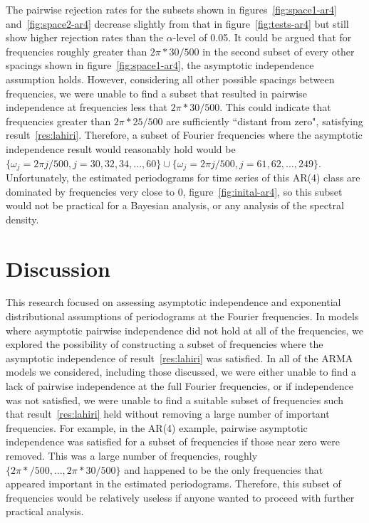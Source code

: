 \documentclass{article}\usepackage{graphicx, color}
\theoremstyle{plain}
\begin{document}
The pairwise rejection rates for the subsets shown in figures~\ref{fig:space1-ar4} and~\ref{fig:space2-ar4} decrease slightly from that in figure~\ref{fig:tests-ar4} but still show higher rejection rates than the $\alpha$-level of 0.05. It could be argued that for frequencies roughly greater than $2\pi * 30/500$ in the second subset of every other spacings shown in figure~\ref{fig:space1-ar4}, the asymptotic independence assumption holds. However, considering all other possible spacings between frequencies, we were unable to find a subset that resulted in pairwise independence at frequencies less that $2\pi * 30/500$. This could indicate that frequencies greater than $2 \pi * 25/500$ are sufficiently ``distant from zero", satisfying result~\ref{res:lahiri}. Therefore, a subset of Fourier frequencies where the asymptotic independence result would reasonably hold would be $\{\omega_j=2\pi j/500, j=30,32,34,...,60\} \cup \{\omega_j=2\pi j/500, j=61,62,...,249\}$. Unfortunately, the estimated periodograms for time series of this AR(4) class are dominated by frequencies very close to 0, figure~\ref{fig:inital-ar4}, so this subset would not be practical for a Bayesian analysis, or any analysis of the spectral density. 


\section{Discussion}

This research focused on assessing asymptotic independence and exponential distributional assumptions of periodograms at the Fourier frequencies. In models where asymptotic pairwise independence did not hold at all of the frequencies, we explored the possibility of constructing a subset of frequencies where the asymptotic independence of result~\ref{res:lahiri} was satisfied. In all of the ARMA models we considered, including those discussed, we were either unable to find a lack of pairwise independence at the full Fourier frequencies, or if independence was not satisfied, we were unable to find a suitable subset of frequencies such that result~\ref{res:lahiri} held without removing a large number of important frequencies. For example, in the AR(4) example, pairwise asymptotic independence was satisfied for a subset of frequencies if those near zero were removed. This was a large number of frequencies, roughly $\{2\pi */500,...,2\pi* 30/500\}$ and happened to be the only frequencies that appeared important in the estimated periodograms. Therefore, this subset of frequencies would be relatively useless if anyone wanted to proceed with further practical analysis.
\end{document}
